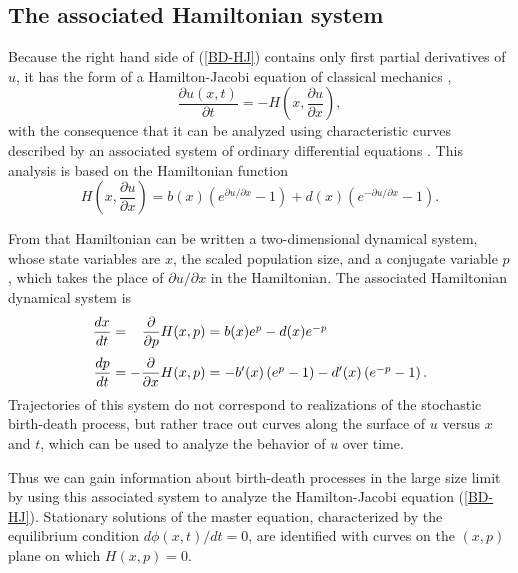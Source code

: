 \documentclass[review]{elsarticle}
\begin{document}
\subsection{The associated Hamiltonian system}

Because the right hand side of (\ref{BD-HJ}) contains only first partial
derivatives of $u$,
it has the form of a
Hamilton-Jacobi equation of classical mechanics \cite{courant_methods_1989},
\begin{dmath*} \frac{\partial u(x,t)}{\partial t} = - H\left(x,\frac{\partial u}{\partial x}\right),
\end{dmath*}
with the consequence that it can be analyzed using characteristic
curves described by an associated system of ordinary differential equations
\cite{hu_stationary_1987}.
This analysis is based on the Hamiltonian function
\begin{dmath*} H\left(x,\frac{\partial u}{\partial x}\right) = b(x) \left(e^{{\partial u}/{\partial x}}-1\right) + d(x) \left(e^{-{\partial u}/{\partial x}}-1\right).
\end{dmath*}

From that Hamiltonian can be written a two-dimensional dynamical
system, whose state variables are $x$, the scaled population size, and a
conjugate variable $p$, which takes the place of
${\partial u}/{\partial x}$ in the Hamiltonian.  The associated
Hamiltonian dynamical system is
\begin{dmath}[label=BD-Hamiltonian-dynamics]
\begin{array}{r@{}r@{}l}
\dfrac{dx}{dt} ={}& \dfrac{\partial}{\partial p}H(x,p)   &{}= b(x) e^p - d(x) e^{-p} \\[12pt]
\dfrac{dp}{dt} ={}& - \dfrac{\partial}{\partial x}H(x,p) &{}= - b'(x) \left(e^p-1\right) - d'(x) \left(e^{-p}-1\right).
\end{array}
\end{dmath}
Trajectories of this system do not correspond to realizations of the
stochastic birth-death process,
but rather trace out curves along the surface of $u$
versus $x$ and $t$, which can be used to analyze the behavior
of $u$ over time.

Thus we can gain information about birth-death processes
in the large size limit
by using this associated system to analyze the
Hamilton-Jacobi equation (\ref{BD-HJ}).
Stationary solutions of the master equation,
characterized by the equilibrium condition $d\phi(x,t)/dt=0$,
are identified with curves on the $(x,p)$ plane on which $H(x,p)=0$.
\end{document}
